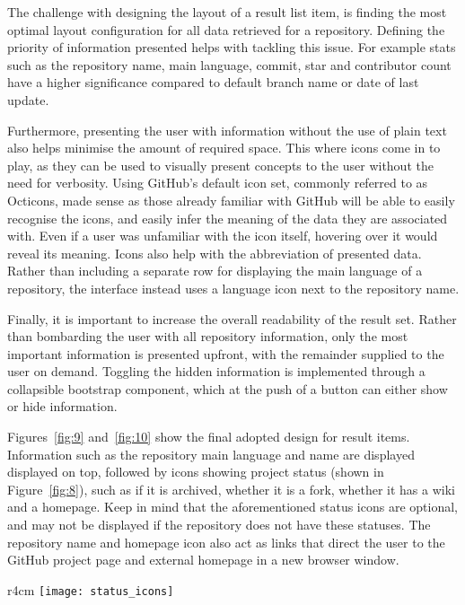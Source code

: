 The challenge with designing the layout of a result list item, is finding the most optimal layout configuration for all data retrieved for a repository.
Defining the priority of information presented helps with tackling this issue.
For example stats such as the repository name, main language, commit, star and contributor count have a higher significance compared to default branch name or date of last update.

Furthermore, presenting the user with information without the use of plain text also helps minimise the amount of required space.
This where icons come in to play, as they can be used to visually present concepts to the user without the need for verbosity.
Using GitHub's default icon set, commonly referred to as Octicons, made sense as those already familiar with GitHub will be able to easily recognise the icons, and easily infer the meaning of the data they are associated with.
Even if a user was unfamiliar with the icon itself, hovering over it would reveal its meaning.
Icons also help with the abbreviation of presented data.
Rather than including a separate row for displaying the main language of a repository, the interface instead uses a language icon next to the repository name.

Finally, it is important to increase the overall readability of the result set.
Rather than bombarding the user with all repository information, only the most important information is presented upfront, with the remainder supplied to the user on demand.
Toggling the hidden information is implemented through a collapsible bootstrap component, which at the push of a button can either show or hide information.

Figures~\ref{fig:9} and~\ref{fig:10} show the final adopted design for result items.
Information such as the repository main language and name are displayed displayed on top, followed by icons showing project status (shown in Figure~\ref{fig:8}), such as if it is archived, whether it is a fork, whether it has a wiki and a homepage.
Keep in mind that the aforementioned status icons are optional, and may not be displayed if the repository does not have these statuses.
The repository name and homepage icon also act as links that direct the user to the GitHub project page and external homepage in a new browser window.

\begin{wrapfigure}{r}{4cm}
    \centering
    \texttt{[image: status\_icons]}
    \caption{Status icons.}
    \label{fig:8}
\end{wrapfigure}

